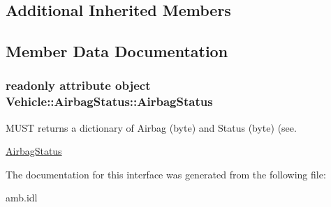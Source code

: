 \subsection*{Additional Inherited Members}


\subsection{Member Data Documentation}
\hypertarget{interfaceVehicle_1_1AirbagStatus_a87cf77029f8953da28ebff9241174cfd}{
\subsubsection[{Airbag\-Status}]{\setlength{\rightskip}{0pt plus 5cm}readonly attribute object Vehicle\-::\-Airbag\-Status\-::\-Airbag\-Status}}\label{interfaceVehicle_1_1AirbagStatus_a87cf77029f8953da28ebff9241174cfd}


M\-U\-S\-T returns a dictionary of Airbag (byte) and Status (byte) (see. 

\hyperlink{interfaceVehicle_1_1AirbagStatus}{Airbag\-Status} 

The documentation for this interface was generated from the following file\-:\begin{DoxyCompactItemize}
\item 
amb.\-idl\end{DoxyCompactItemize}
